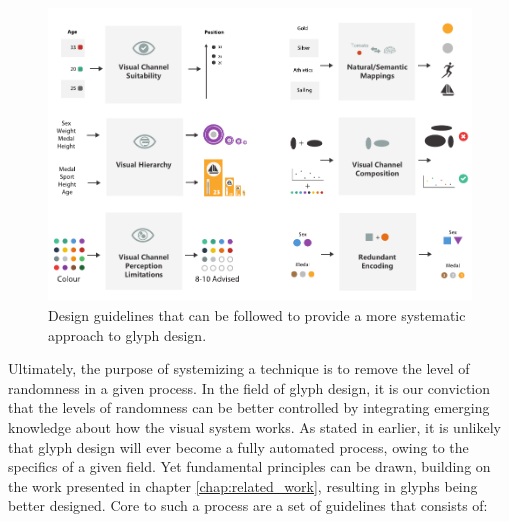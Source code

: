 \begin{figure}[h!]
\centering
\includegraphics[width=\textwidth]{images/ch3/design_guidelines_2}
\caption{Design guidelines that can be followed to provide a more systematic approach to glyph design.}
\label{fig:strategies_design_guidelines}
\end{figure}

Ultimately, the purpose of systemizing a technique is to remove the level of randomness in a given process.
In the field of glyph design, it is our conviction that the levels of randomness can be better controlled by integrating emerging knowledge about how the visual system works.
As stated in earlier, it is unlikely that glyph design will ever become a  fully automated process, owing to the specifics of a given field. Yet fundamental principles can be drawn, building on the work presented in chapter \ref{chap:related_work}, resulting in glyphs being better designed.
Core to such a process are a set of guidelines that consists of:

